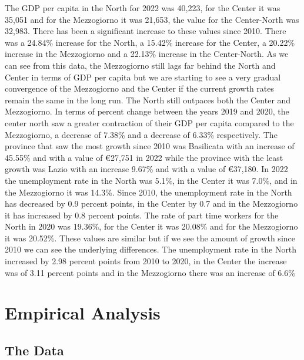 \documentclass[12pt]{article}
\begin{document}
\begin{spacing}{1.5}
The GDP per capita in the North for 2022 was 40,223, for the Center it was 35,051 and for the Mezzogiorno it was 21,653, the value for the Center-North was 32,983. There has been a significant increase to these values since 2010. There was a 24.84\% increase for the North, a 15.42\% increase for the Center, a 20.22\% increase in the Mezzogiorno and a 22.13\% increase in the Center-North. As we can see from this data, the Mezzogiorno still lags far behind the North and Center in terms of GDP per capita but we are starting to see a very gradual convergence of the Mezzogiorno and the Center if the current growth rates remain the same in the long run. The North still outpaces both the Center and Mezzogiorno. In terms of percent change between the years 2019 and 2020, the center north saw a greater contraction of their GDP per capita compared to the Mezzogiorno, a decrease of 7.38\% and a decrease of 6.33\% respectively. The province that saw the most growth since 2010 was Basilicata with an increase of 45.55\% and with a value of €27,751 in 2022 while the province with the least growth was Lazio with an increase 9.67\% and with a value of €37,180. In 2022 the unemployment rate in the North was 5.1\%, in the Center it was 7.0\%, and in the Mezzogiorno it was 14.3\%. Since 2010, the unemployment rate in the North has decreased by 0.9 percent points, in the Center by 0.7 and in the Mezzogiorno it has increased by 0.8 percent points. The rate of part time workers for the North in 2020 was 19.36\%, for the Center it was 20.08\% and for the Mezzogiorno it was 20.52\%. These values are similar but if we see the amount of growth since 2010 we can see the underlying differences. The unemployment rate in the North increased by 2.98 percent points from 2010 to 2020, in the Center the increase was of 3.11 percent points and in the Mezzogiorno there was an increase of 6.6\%

\end{spacing}

\section{Empirical Analysis}

\subsection{The Data}
\end{document}
